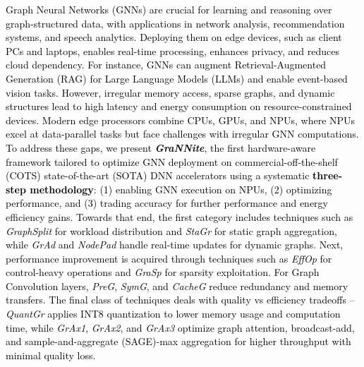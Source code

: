 \noindent
\textcolor{black}{
Graph Neural Networks (GNNs) are crucial for learning and reasoning over graph-structured data, with applications in network analysis, recommendation systems, and speech analytics. Deploying them on edge devices, such as client PCs and laptops, enables real-time processing, enhances privacy, and reduces cloud dependency. For instance, GNNs can augment Retrieval-Augmented Generation (RAG) for Large Language Models (LLMs) and enable event-based vision tasks. However, irregular memory access, sparse graphs, and dynamic structures lead to high latency and energy consumption on resource-constrained devices. Modern edge processors combine CPUs, GPUs, and NPUs, where NPUs excel at data-parallel tasks but face challenges with irregular GNN computations.
To address these gaps, we present \textbf{\textit{GraNNite}}, the first hardware-aware framework tailored to optimize GNN deployment on commercial-off-the-shelf (COTS) state-of-the-art (SOTA) DNN accelerators using a systematic \textbf{three-step methodology}: (1) enabling GNN execution on NPUs, (2) optimizing performance, and (3) trading accuracy for further performance and energy efficiency gains.
Towards that end, the first category includes techniques such as \textit{GraphSplit} for workload distribution and \textit{StaGr} for static graph aggregation, while \textit{GrAd} and \textit{NodePad} handle real-time updates for dynamic graphs. Next, performance improvement is acquired through techniques such as \textit{EffOp} for control-heavy operations and \textit{GraSp} for sparsity exploitation. For Graph Convolution layers, \textit{PreG}, \textit{SymG}, and \textit{CacheG} reduce redundancy and memory transfers. The final class of techniques deals with quality vs efficiency tradeoffs -- \textit{QuantGr} applies INT8 quantization to lower memory usage and computation time, while \textit{GrAx1}, \textit{GrAx2}, and \textit{GrAx3} optimize graph attention, broadcast-add, and sample-and-aggregate (SAGE)-max aggregation for higher throughput with minimal quality loss.
}
